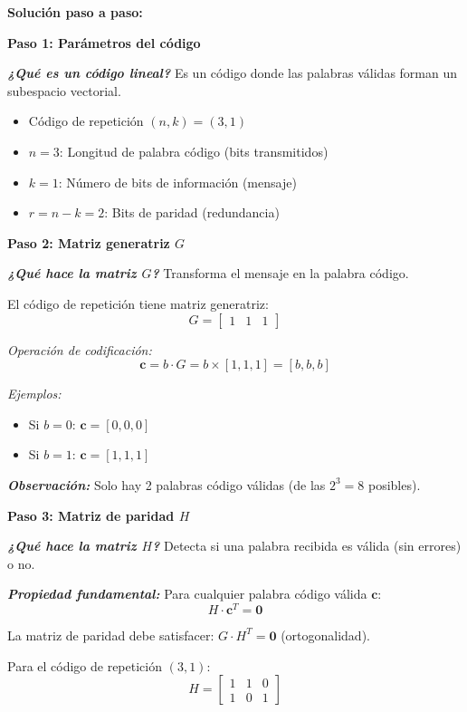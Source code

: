 \documentclass[11pt,a4paper]{article}
\begin{document}
\vspace{0.3cm}
\textbf{Soluci\'on paso a paso:}

\textbf{Paso 1: Par\'ametros del c\'odigo}

\textit{\textbf{¿Qu\'e es un c\'odigo lineal?}} Es un c\'odigo donde las palabras v\'alidas forman un subespacio vectorial.

\begin{itemize}
    \item C\'odigo de repetici\'on $(n, k) = (3, 1)$
    \item $n = 3$: Longitud de palabra c\'odigo (bits transmitidos)
    \item $k = 1$: N\'umero de bits de informaci\'on (mensaje)
    \item $r = n - k = 2$: Bits de paridad (redundancia)
\end{itemize}

\textbf{Paso 2: Matriz generatriz $G$}

\textit{\textbf{¿Qu\'e hace la matriz $G$?}} Transforma el mensaje en la palabra c\'odigo.

El c\'odigo de repetici\'on tiene matriz generatriz:
\[
G = \begin{bmatrix} 1 & 1 & 1 \end{bmatrix}
\]

\textit{Operaci\'on de codificaci\'on:}
\[
\mathbf{c} = b \cdot G = b \times [1, 1, 1] = [b, b, b]
\]

\textit{Ejemplos:}
\begin{itemize}
    \item Si $b = 0$: $\mathbf{c} = [0, 0, 0]$
    \item Si $b = 1$: $\mathbf{c} = [1, 1, 1]$
\end{itemize}

\textit{\textbf{Observaci\'on:}} Solo hay 2 palabras c\'odigo v\'alidas (de las $2^3 = 8$ posibles).

\textbf{Paso 3: Matriz de paridad $H$}

\textit{\textbf{¿Qu\'e hace la matriz $H$?}} Detecta si una palabra recibida es v\'alida (sin errores) o no.

\textit{\textbf{Propiedad fundamental:}} Para cualquier palabra c\'odigo v\'alida $\mathbf{c}$:
\[
H \cdot \mathbf{c}^T = \mathbf{0}
\]

La matriz de paridad debe satisfacer: $G \cdot H^T = \mathbf{0}$ (ortogonalidad).

Para el c\'odigo de repetici\'on $(3,1)$:
\[
\boxed{H = \begin{bmatrix}
1 & 1 & 0 \\
1 & 0 & 1
\end{bmatrix}}
\]
\end{document}
